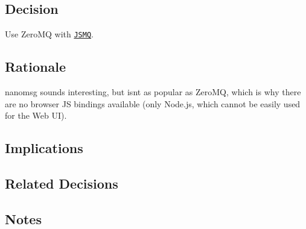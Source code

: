 \subsection*{Decision}

Use Zero\+MQ with \href{https://github.com/zeromq/JSMQ}{\tt J\+S\+MQ}.

\subsection*{Rationale}

nanomsg sounds interesting, but isn\textquotesingle{}t as popular as Zero\+MQ, which is why there are no browser JS bindings available (only Node.\+js, which cannot be easily used for the Web UI).

\subsection*{Implications}

\subsection*{Related Decisions}

\subsection*{Notes}